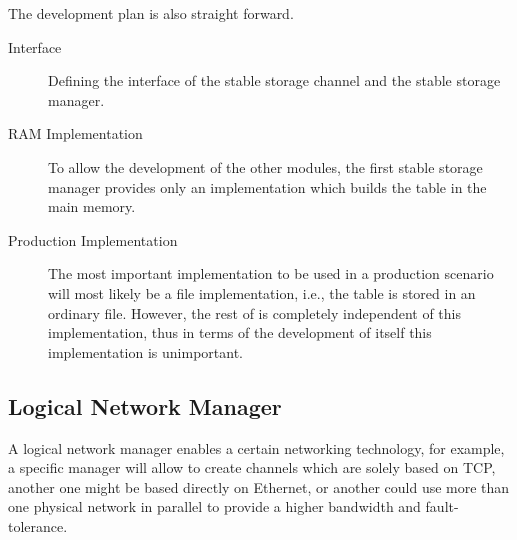 \documentclass[a4paper, 10pt]{book}
\begin{document}
                                The development plan is also straight forward.
                                \begin{description}
                                    \item[Interface] Defining the interface of the stable storage channel
                                        and the stable storage manager. 
                                    \item[RAM Implementation] To allow the development of the other
                                        modules, the first stable storage manager provides only an
                                        implementation which builds the table in the main memory.
                                    \item[Production Implementation] The most important implementation to
                                        be used in a production scenario will most likely be a file
                                        implementation, i.e., the table is stored in an ordinary file.
                                        However, the rest of \SYNEIGHT is completely independent of this
                                        implementation, thus in terms of the development of \SYNEIGHT itself
                                        this implementation is unimportant.
                                \end{description}

                                \subsection{Logical Network Manager}
                                \label{sec:logic-netw-manag}

                                A logical network manager enables a certain networking technology, for
                                example, a specific manager will allow to create channels which are
                                solely based on TCP, another one might be based directly on Ethernet,
                                or another could use more than one physical network in parallel to
                                provide a higher bandwidth and fault-tolerance.
\end{document}
